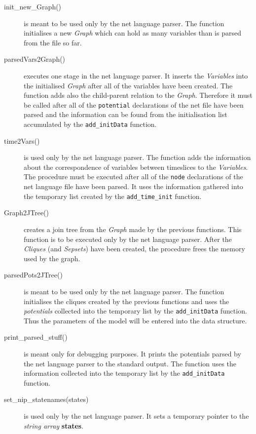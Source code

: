 \documentclass[12pt,a4paper]{report}
\newcommand{\cdatatype}[1]{{\it #1}}
\newcommand{\examplecode}[1]{\texttt{#1}}
\newcommand{\cparameter}[1]{\textbf{#1}}
\newcommand{\cfunction}[1]{\texttt{#1}}
\begin{document}
\begin{description}
\item[init\_new\_Graph()] is meant to be used only by the net language
parser. The function initialises a new \cdatatype{Graph} which can hold as
many variables than is parsed from the file so far.

\item[parsedVars2Graph()] executes one stage in the net language
parser. It inserts the \cdatatype{Variables} into the initialised
\cdatatype{Graph} after all of the variables have been created. The
function adds also the child-parent relation to the
\cdatatype{Graph}. Therefore it must be called after all of the
\verb+potential+ declarations of the net file have been parsed and the
information can be found from the initialisation list accumulated by
the \cfunction{add\_initData} function.

\item[time2Vars()] is used only by the net language parser. The
function adds the information about the correspondence of variables
between timeslices to the \cdatatype{Variables}. The procedure must be
executed after all of the \examplecode{node} declarations of the net 
language file have been parsed. It uses the information gathered into the
temporary list created by the \cfunction{add\_time\_init} function.

\item[Graph2JTree()] creates a join tree from the \cdatatype{Graph} made by
the previous functions. This function is to be executed only by the
net language parser. After the \cdatatype{Cliques} (and 
\cdatatype{Sepsets}) have been created, the procedure frees the memory 
used by the graph.

\item[parsedPots2JTree()] is meant to be used only by the net language
parser. The function initialises the cliques created by the previous
functions and uses the \cdatatype{potentials} collected into the temporary
list by the \cfunction{add\_initData} function. Thus the parameters of the
model will be entered into the data structure.

\item[print\_parsed\_stuff()] is meant only for debugging purposes. It
prints the potentials parsed by the net language parser to the
standard output. The function uses the information collected into the 
temporary list by the \cfunction{add\_initData} function.

\item[set\_nip\_statenames(states)] is used only by the net language
parser. It sets a temporary pointer to the \cdatatype{string array}
\cparameter{states}. 


\end{description}
\end{document}
